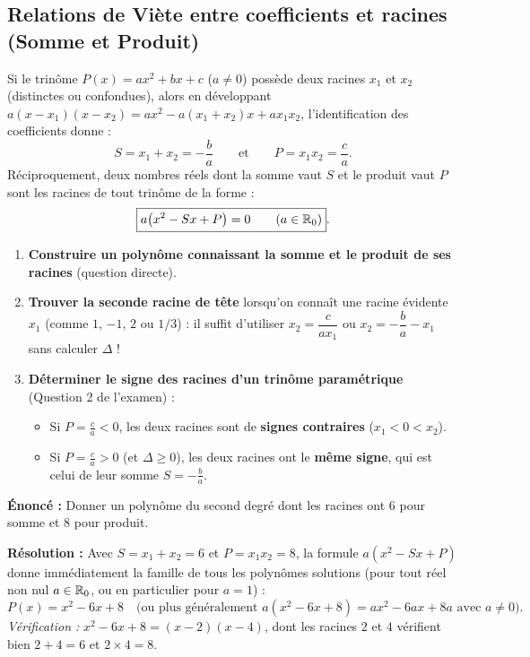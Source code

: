 \subsection{Relations de Viète entre coefficients et racines (Somme et Produit)}

\begin{theoreme}
Si le trinôme $P(x) = ax^2 + bx + c$ ($a \neq 0$) possède deux racines $x_1$ et $x_2$ (distinctes ou confondues), alors en développant $a(x - x_1)(x - x_2) = ax^2 - a(x_1 + x_2)x + ax_1 x_2$, l'identification des coefficients donne :
\[
    \boxed{S = x_1 + x_2 = -\frac{b}{a}} \qquad \text{et} \qquad \boxed{P = x_1 x_2 = \frac{c}{a}}.
\]
Réciproquement, deux nombres réels dont la somme vaut $S$ et le produit vaut $P$ sont les racines de tout trinôme de la forme :
\[
    \boxed{a\bigl(x^2 - Sx + P\bigr) = 0 \qquad (a \in \mathbb{R}_0)}.
\]
\end{theoreme}

\begin{astuce}
\begin{enumerate}
    \item \textbf{Construire un polynôme connaissant la somme et le produit de ses racines} (question directe).
    \item \textbf{Trouver la seconde racine de tête} lorsqu'on connaît une racine évidente $x_1$ (comme $1$, $-1$, $2$ ou $1/3$) : il suffit d'utiliser $x_2 = \dfrac{c}{a x_1}$ ou $x_2 = -\dfrac{b}{a} - x_1$ sans calculer $\Delta$ !
    \item \textbf{Déterminer le signe des racines d'un trinôme paramétrique} (Question 2 de l'examen) :
    \begin{itemize}
        \item Si $P = \frac{c}{a} < 0$, les deux racines sont de \textbf{signes contraires} ($x_1 < 0 < x_2$).
        \item Si $P = \frac{c}{a} > 0$ (et $\Delta \ge 0$), les deux racines ont le \textbf{même signe}, qui est celui de leur somme $S = -\frac{b}{a}$.
    \end{itemize}
\end{enumerate}
\end{astuce}

\begin{exemple}
\textbf{Énoncé :} Donner un polynôme du second degré dont les racines ont $6$ pour somme et $8$ pour produit.

\textbf{Résolution :} Avec $S = x_1 + x_2 = 6$ et $P = x_1 x_2 = 8$, la formule $a(x^2 - Sx + P)$ donne immédiatement la famille de tous les polynômes solutions (pour tout réel non nul $a \in \mathbb{R}_0$, ou en particulier pour $a = 1$) :
\[
    \boxed{P(x) = x^2 - 6x + 8} \quad \text{(ou plus généralement } a(x^2 - 6x + 8) = ax^2 - 6ax + 8a \text{ avec } a \neq 0\text{)}.
\]
\emph{Vérification :} $x^2 - 6x + 8 = (x - 2)(x - 4)$, dont les racines $2$ et $4$ vérifient bien $2 + 4 = 6$ et $2 \times 4 = 8$.
\end{exemple}


